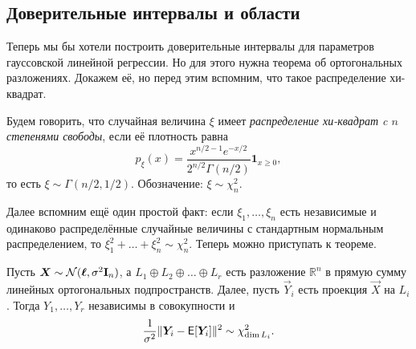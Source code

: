 \subsection{Доверительные интервалы и области}
Теперь мы бы хотели построить доверительные интервалы для параметров гауссовской линейной регрессии. Но для этого нужна теорема об ортогональных разложениях. Докажем её, но перед этим вспомним, что такое распределение хи-квадрат.
\begin{definition}
	Будем говорить, что случайная величина $\xi$ имеет \emph{распределение хи-квадрат c $n$ степенями свободы}, если её плотность равна
	\[
		p_{\xi}(x) = \frac{x^{n/2 - 1}e^{-x/2}}{2^{n/2}\Gamma(n/2)}\mathbf{1}_{x \geq 0},
	\]
	то есть $\xi \sim \Gamma(n/2, 1/2)$. Обозначение: $\xi \sim \chi^{2}_{n}$.
\end{definition}
Далее вспомним ещё один простой факт: если $\xi_{1}, \ldots, \xi_{n}$ есть независимые и одинаково распределённые случайные величины с стандартным нормальным распределением, то $\xi_{1}^{2} + \ldots + \xi_{n}^{2} \sim \chi^{2}_{n}$. Теперь можно приступать к теореме.
\begin{theorem}
	Пусть $\bm{X} \sim \mathcal{N}(\bm{\ell}, \sigma^{2}\mathbf{I}_{n})$, а $L_{1} \oplus L_{2} \oplus \ldots \oplus L_{r}$ есть разложение $\mathbb{R}^{n}$ в прямую сумму линейных ортогональных подпространств. Далее, пусть $\vec{Y}_{i}$ есть проекция $\vec{X}$ на $L_{i}$. Тогда $Y_{1}, \ldots, Y_{r}$ независимы в совокупности и 
	\[
		\frac{1}{\sigma^{2}}\|\bm{Y}_{i} - \operatorname{\mathsf{E}}[\bm{Y}_{i}]\|^{2} \sim \chi^{2}_{\operatorname{dim} L_{i}}.
	\]
\end{theorem}
